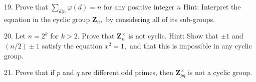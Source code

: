 \begin{mdframed}[style=darkAnswer,frametitle={Joe Starr}]
\end{mdframed}
\newpage
\begin{mdframed}[style=darkQuesion]
  19. Prove that $\sum_{d | n} \varphi(d)=n$ for any positive integer $n$ Hint: Interpret the equation in the cyclic group $\mathbf{Z}_{n},$ by considering all of its sub-groups.
\end{mdframed}
\begin{mdframed}[style=darkAnswer,frametitle={Joe Starr}]
\end{mdframed}
\newpage
\begin{mdframed}[style=darkQuesion]
  20. Let $n=2^{k}$ for $k>2 .$ Prove that $\mathbf{Z}_{n}^{\times}$ is not cyclic. 
  Hint: Show that $\pm 1$ and $(n / 2) \pm 1$ satisfy the equation $x^{2}=1,$ and that this is impossible in any cyclic group.
\end{mdframed}
\begin{mdframed}[style=darkAnswer,frametitle={Joe Starr}]
\end{mdframed}
\newpage
\begin{mdframed}[style=darkQuesion]
  21.  Prove that if $p$ and $q$ are different odd primes, then $\mathbf{Z}_{p q}^{\times}$ is not a cyclic group.
\end{mdframed}
\begin{mdframed}[style=darkAnswer,frametitle={Joe Starr}]
\end{mdframed}
\newpage
